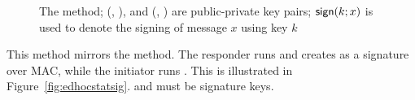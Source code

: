 \begin{figure}[h]
{}
    \caption{The \mSigStat{} method; (\mCredi{}, \mLtki), and
        (\mCredr{}, \mLtkr{}) are public-private key pairs; $\textsf{sign}(k; x)$ is
    used to denote the signing of message $x$ using key $k$}
\label{fig:edhocsigstat}
\end{figure}

 
\runhead{\mStatSig}
This method mirrors the \mSigStat{} method.
%
The responder runs \mSig{} and creates \mAuthr{} as a signature over MAC,
while the initiator runs \mStat{}.
%
This is illustrated in Figure~\ref{fig:edhocstatsig}. \mCredr{} and \mLtkr{}
must be signature keys.\\
%

